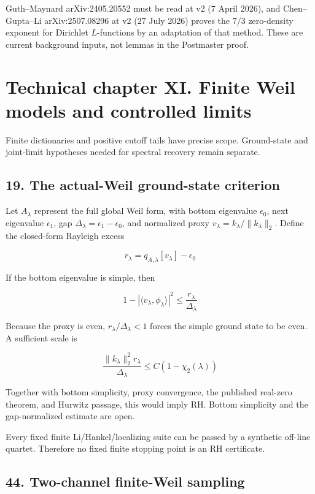 \documentclass[
  11pt,
]{book}
\begin{document}
Guth--Maynard arXiv:2405.20552 must be read at v2 (7 April 2026), and
Chen--Gupta--Li arXiv:2507.08296 at v2 (27 July 2026) proves the \(7/3\)
zero-density exponent for Dirichlet \(L\)-functions by an adaptation of
that method. These are current background inputs, not lemmas in the
Postmaster proof.


\chapter{Technical chapter XI. Finite Weil models and controlled
limits}\label{technical-chapter-xi.-finite-weil-models-and-controlled-limits}

Finite dictionaries and positive cutoff tails have precise scope.
Ground-state and joint-limit hypotheses needed for spectral recovery
remain separate.

\section{19. The actual-Weil ground-state
criterion}\label{the-actual-weil-ground-state-criterion}

Let \(A_\lambda\) represent the full global Weil form, with bottom
eigenvalue \(\epsilon_0\), next eigenvalue \(\epsilon_1\), gap
\(\Delta_\lambda=\epsilon_1-\epsilon_0\), and normalized proxy
\(v_\lambda=k_\lambda/\|k_\lambda\|_2\). Define the closed-form Rayleigh
excess

\[
r_\lambda=q_{A,\lambda}[v_\lambda]-\epsilon_0
\]

If the bottom eigenvalue is simple, then

\[
1-|\langle v_\lambda,\phi_\lambda\rangle|^2
\le\frac{r_\lambda}{\Delta_\lambda}
\]

Because the proxy is even, \(r_\lambda/\Delta_\lambda<1\) forces the
simple ground state to be even. A sufficient scale is

\[
\boxed{
\frac{\|k_\lambda\|_2^2r_\lambda}{\Delta_\lambda}
\le C(1-\chi_2(\lambda))
}
\]

Together with bottom simplicity, proxy convergence, the published
real-zero theorem, and Hurwitz passage, this would imply RH. Bottom
simplicity and the gap-normalized estimate are open.

Every fixed finite Li/Hankel/localizing suite can be passed by a
synthetic off-line quartet. Therefore no fixed finite stopping point is
an RH certificate.

\section{44. Two-channel finite-Weil
sampling}\label{two-channel-finite-weil-sampling}
\end{document}
